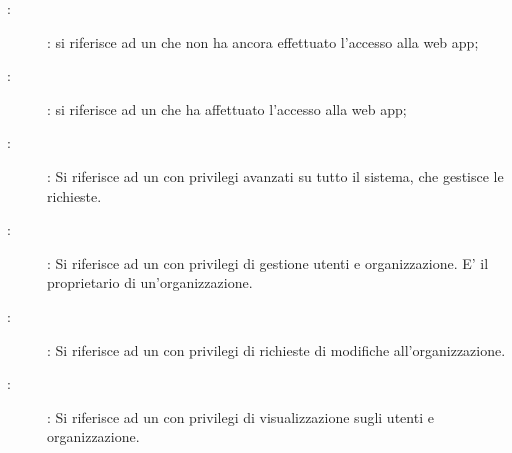 \documentclass[../analisi-dei-requisiti.tex]{subfiles}
\begin{document}
\begin{description}
  \item[:]: si riferisce ad un  che non ha ancora effettuato l'accesso alla web app;
  \item[:]: si riferisce ad un  che ha affettuato l'accesso alla web app;
  \item[:]: Si riferisce ad un  con privilegi avanzati su tutto il sistema, che gestisce le richieste.
  \item[:]: Si riferisce ad un  con privilegi di gestione utenti e organizzazione. E' il proprietario di un'organizzazione.
  \item[:]: Si riferisce ad un  con privilegi di richieste di modifiche all'organizzazione.
  \item[:]: Si riferisce ad un  con privilegi di visualizzazione sugli utenti e organizzazione.
\end{description}

\end{document}
